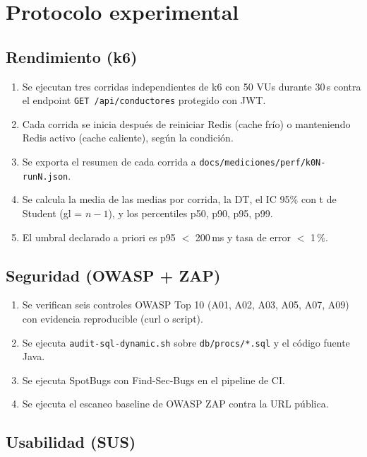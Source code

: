 \section{Protocolo experimental}
\label{sec:protocolo}

\subsection{Rendimiento (k6)}

\begin{enumerate}
  \item Se ejecutan tres corridas independientes de k6 con 50 VUs durante 30\,s contra el endpoint \texttt{GET /api/conductores} protegido con JWT.
  \item Cada corrida se inicia después de reiniciar Redis (cache frío) o manteniendo Redis activo (cache caliente), según la condición.
  \item Se exporta el resumen de cada corrida a \texttt{docs/mediciones/perf/k0N-runN.json}.
  \item Se calcula la media de las medias por corrida, la DT, el IC 95\% con t de Student (gl = $n - 1$), y los percentiles p50, p90, p95, p99.
  \item El umbral declarado a priori es p95 $<$ 200\,ms y tasa de error $<$ 1\,\%.
\end{enumerate}

\subsection{Seguridad (OWASP + ZAP)}

\begin{enumerate}
  \item Se verifican seis controles OWASP Top 10 (A01, A02, A03, A05, A07, A09) con evidencia reproducible (curl o script).
  \item Se ejecuta \texttt{audit-sql-dynamic.sh} sobre \texttt{db/procs/*.sql} y el código fuente Java.
  \item Se ejecuta SpotBugs con Find-Sec-Bugs en el pipeline de CI.
  \item Se ejecuta el escaneo baseline de OWASP ZAP contra la URL pública.
\end{enumerate}

\subsection{Usabilidad (SUS)}

